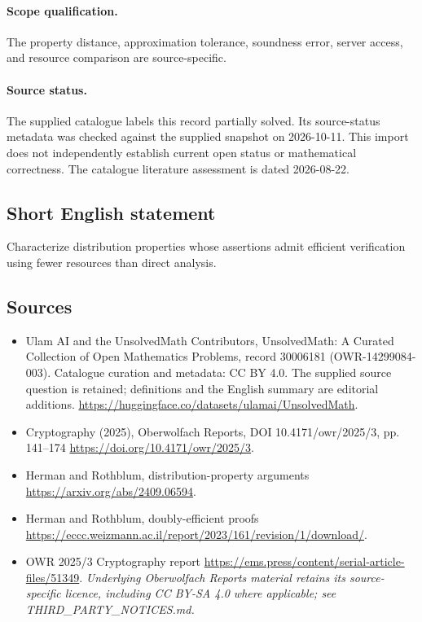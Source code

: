 \documentclass[11pt]{article}
\begin{document}
\paragraph{Scope qualification.}
The property distance, approximation tolerance, soundness error, server access, and resource comparison are source-specific.
\paragraph{Source status.}
The supplied catalogue labels this record partially solved. Its source-status metadata was checked against the supplied snapshot on 2026-10-11. This import does not independently establish current open status or mathematical correctness. The catalogue literature assessment is dated 2026-08-22.
\subsection{Short English statement}
Characterize distribution properties whose assertions admit efficient verification using fewer resources than direct analysis.
\subsection{Sources}
\begin{itemize}
\item[S1] Ulam AI and the UnsolvedMath Contributors, UnsolvedMath: A Curated Collection of Open Mathematics Problems, record 30006181 (OWR-14299084-003). Catalogue curation and metadata: CC BY 4.0. The supplied source question is retained; definitions and the English summary are editorial additions.
\url{https://huggingface.co/datasets/ulamai/UnsolvedMath}.
\item[S2] Cryptography (2025), Oberwolfach Reports, DOI 10.4171/owr/2025/3, pp. 141--174
\url{https://doi.org/10.4171/owr/2025/3}.
\item[S3] Herman and Rothblum, distribution-property arguments
\url{https://arxiv.org/abs/2409.06594}.
\item[S4] Herman and Rothblum, doubly-efficient proofs
\url{https://eccc.weizmann.ac.il/report/2023/161/revision/1/download/}.
\item[S5] OWR 2025/3 Cryptography report
\url{https://ems.press/content/serial-article-files/51349}.
\textit{Underlying Oberwolfach Reports material retains its source-specific licence, including CC BY-SA 4.0 where applicable; see THIRD\_PARTY\_NOTICES.md.}
\end{itemize}
\end{document}
